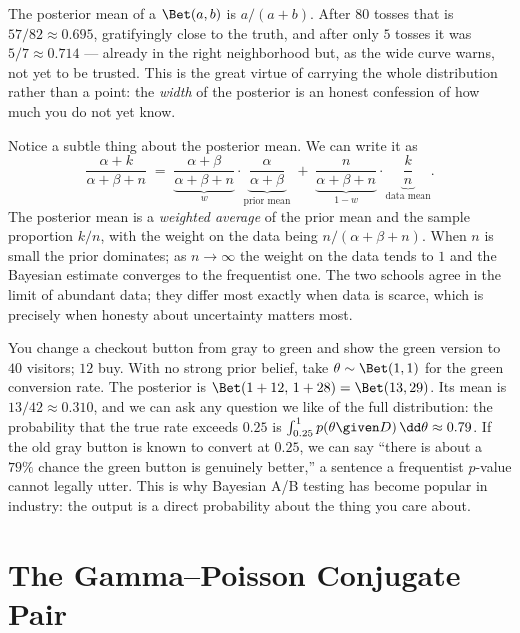 The posterior mean of a $\Bet(a,b)$ is $a/(a+b)$. After $80$ tosses that is
$57/82 \approx 0.695$, gratifyingly close to the truth, and after only $5$ tosses it was
$5/7 \approx 0.714$ --- already in the right neighborhood but, as the wide curve warns, not
yet to be trusted. This is the great virtue of carrying the whole distribution rather than
a point: the \emph{width} of the posterior is an honest confession of how much you do not
yet know.

\begin{walkbox}
Notice a subtle thing about the posterior mean. We can write it as
\[
  \frac{\alpha + k}{\alpha + \beta + n}
  \;=\; \underbrace{\frac{\alpha+\beta}{\alpha+\beta+n}}_{w}\cdot
        \underbrace{\frac{\alpha}{\alpha+\beta}}_{\text{prior mean}}
   \;+\; \underbrace{\frac{n}{\alpha+\beta+n}}_{1-w}\cdot
        \underbrace{\frac{k}{n}}_{\text{data mean}}.
\]
The posterior mean is a \emph{weighted average} of the prior mean and the sample
proportion $k/n$, with the weight on the data being $n/(\alpha+\beta+n)$. When $n$ is small
the prior dominates; as $n\to\infty$ the weight on the data tends to $1$ and the Bayesian
estimate converges to the frequentist one. The two schools agree in the limit of abundant
data; they differ most exactly when data is scarce, which is precisely when honesty about
uncertainty matters most.
\end{walkbox}

\begin{example}
\label{ch31:ex-ab}
You change a checkout button from gray to green and show the green version to $40$ visitors;
$12$ buy. With no strong prior belief, take $\theta\sim\Bet(1,1)$ for the green
conversion rate. The posterior is $\Bet(1+12,\,1+28) = \Bet(13,29)$. Its mean is
$13/42 \approx 0.310$, and we can ask any question we like of the full distribution: the
probability that the true rate exceeds $0.25$ is $\int_{0.25}^{1} p(\theta\given D)\,
\dd\theta \approx 0.79$. If the old gray button is known to convert at $0.25$, we can say
``there is about a $79\%$ chance the green button is genuinely better,'' a sentence a
frequentist $p$-value cannot legally utter. This is why Bayesian A/B testing has become
popular in industry: the output is a direct probability about the thing you care about.
\end{example}

\section{The Gamma--Poisson Conjugate Pair}
\label{ch31:gamma-poisson}

